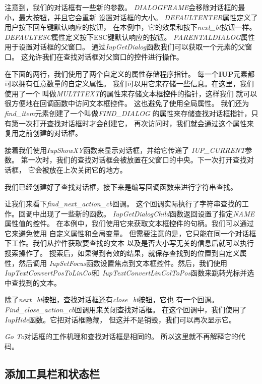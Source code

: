 \documentclass{ctexart}
\begin{document}
注意到，我们的对话框有一些新的参数。
\emph{DIALOGFRAME}会移除对话框的最小，最大按钮，并且它会重新
设置对话框的大小。
\emph{DEFAULTENTER}属性定义了用户按下回车键默认响应的按钮，
在本例中，它的效果和按下\emph{next\_bt}按钮一样。
\emph{DEFAULTESC}属性定义按下ESC键默认响应的按钮。
\emph{PARENTALDIALOG}属性用于设置对话框的父窗口。
通过\emph{IupGetDialog}函数我们可以获取一个元素的父窗口。
这允许我们在查找对话框对父窗口的控件进行操作。

在下面的两行，我们使用了两个自定义的属性存储程序指针。
每一个\textbf{IUP}元素都可以拥有任意数量的自定义属性。
我们可以用它来存储一些信息。在这里，我们使用了一个
叫做\emph{MULTITEXT}的属性来存储文本框控件的指针，这样我们
就可以很方便地在回调函数中访问文本框控件。
这也避免了使用全局属性。
我们还为\emph{find\_item}元素创建了一个叫做\emph{FIND\_DIALOG}
的属性来存储查找对话框指针，只有第一次打开查找对话框时才会创建它，
再次访问时，我们就会通过这个属性来复用之前创建的对话框。

接着我们使用\emph{IupShowXY}函数来显示对话框，并给它传递了
\emph{IUP\_CURRENT}参数。
第一次时，我们的查找对话框会被放置在父窗口的中央。下一次打开查找对话框，
它会被放在上次关闭它的地方。

我们已经创建好了查找对话框，接下来是编写回调函数来进行字符串查找。

让我们来看下\emph{find\_next\_action\_cb}回调。
这个回调实际执行了字符串查找的工作。回调中出现了一些新的函数。
\emph{IupGetDialogChild}函数返回设置了指定\emph{NAME}
属性值的控件。
在本例中，我们使用它来获取文本框控件的句柄。我们可以通过它来避免使用
自定义属性和全局变量。
但需要注意的是，它只能在同一个对话框下工作。我们从控件获取要查找的文本
以及是否大小写无关的信息后就可以执行搜索操作了。
搜索后，如果得到有效的结果，就保存查找到的位置到自定义属性，然后调用
\emph{IupSetFocus}函数设置焦点到文本框控件。然后，我们使用
\emph{IupTextConvertPosToLinCol}和
\emph{IupTextConvertLinColToPos}函数来跳转光标并选中查找到的文本。

除了\emph{next\_bt}按钮，查找对话框还有\emph{close\_bt}按钮，它也
有一个回调。\emph{Find\_close\_action\_cb}回调用来关闭查找对话框。
在这个回调中，我们使用了\emph{IupHide}函数。它把对话框隐藏，
但这并不是销毁，我们可以再次显示它。

\emph{Go To}对话框的工作机理和查找对话框是相同的。
所以这里就不再解释它的代码。

\subsection{添加工具栏和状态栏}
\end{document}
